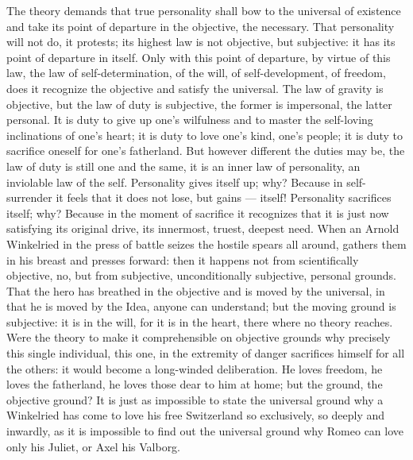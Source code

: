 \documentclass[12pt,a4paper,openany]{book}
\newcommand{\opage}[1]{\marginnote{\footnotesize\textit{[#1]}}}
\begin{document}
The theory demands that true personality shall
bow to the universal of existence and take its point of departure
in the objective, the necessary. That personality
will not do, it protests; its highest law is not
objective, but subjective: it has its point of departure in itself.
Only with this point of departure, by virtue of this law,
the law of self-determination, of the will, of self-development, of freedom,
does it recognize the objective and satisfy the
universal. The law of gravity is objective, but the law of duty is
subjective, the former is impersonal, the latter personal. It is
duty to give up one's wilfulness and to master the self-loving
inclinations of one's heart; it is duty to love one's
kind, one's people; it is duty to sacrifice oneself for one's fatherland.
But however different the duties may be, the law of duty is
still one and the same, it is an inner law of
personality, an inviolable law of the self. Personality
gives itself up; why? Because in self-surrender it
feels that it does not lose, but gains --- itself! Personality
sacrifices itself; why? Because in the moment of
sacrifice it recognizes that it is just now satisfying its
original drive, its innermost, truest, deepest need.
\setcounter{footnote}{0}%
\opage{598}When an Arnold Winkelried in the press of battle seizes
the hostile spears all around, gathers them in his breast and
presses forward: then it happens not from scientifically objective,
no, but from subjective, unconditionally subjective, personal
grounds. That the hero has breathed in the objective and is moved
by the universal, in that he is moved by the Idea, anyone
can understand; but the moving ground is subjective:
it is in the will, for it is in the heart, there where
no theory reaches. Were the theory to make it comprehensible
on objective grounds why precisely this single individual,
this one, in the extremity of danger sacrifices himself for all the others:
it would become a long-winded deliberation. He loves
freedom, he loves the fatherland, he loves those
dear to him at home; but the ground, the objective ground?
It is just as impossible to state the universal ground
why a Winkelried has come to love his free Switzerland
so exclusively, so deeply and inwardly, as it is
impossible to find out the universal ground why Romeo can love
only his Juliet, or Axel his Valborg.
\end{document}
